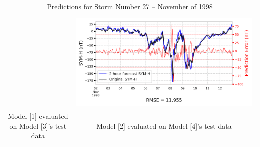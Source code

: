 \documentclass[draft,sw]{agutexSI2019}
\begin{document}
\begin{table}
\begin{tabular}{cc}
&
\includegraphics[width=0.49\linewidth]{paper_plots/2h_swics_model_on_no_swics/2h_swics_model_on_no_swics_storm_27.png}
\\
Model [1] evaluated on Model [3]'s test data & Model [2] evaluated on Model [4]'s test data
\vspace*{12pt}
\\
\end{tabular}
\caption{Predictions for Storm Number 27 -- November of 1998}
\label{storm-27}
\end{table}
\end{document}
